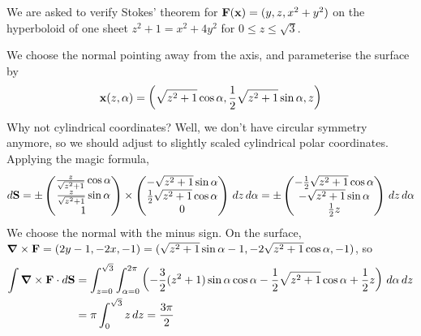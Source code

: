 \documentclass{../template/note}
\begin{document}
    \begin{example*}[hard]
        We are asked to verify Stokes' theorem for \(\V F(\V x) = (y, z, x^2+y^2)\) on the hyperboloid of one sheet \(z^2 + 1 = x^2 + 4y^2\) for \(0 \leq z \leq \sqrt 3\).

        We choose the normal pointing away from the axis, and parameterise the surface by
        \begin{align*}
            \V x(z, \alpha) = \left(\sqrt{z^2+1} \cos \alpha, \frac 1 2\sqrt{z^2+1}\sin \alpha, z\right)
        \end{align*}
        Why not cylindrical coordinates? Well, we don't have circular symmetry anymore, so we should adjust to slightly scaled cylindrical polar coordinates. Applying the magic formula,
        \begin{align*}
            d \V S = \pm \begin{pmatrix}
             \frac z{\sqrt{z^2+1}} \cos \alpha \\
             \frac z{\sqrt{z^2+1}} \sin \alpha \\
             1 \\
            \end{pmatrix} \times \begin{pmatrix}
             -\sqrt{z^2+1} \sin \alpha \\
             \frac 1 2 \sqrt{z^2+1} \cos \alpha \\
             0 \\
            \end{pmatrix} \D z \D \alpha = \pm \begin{pmatrix}
             -\frac 1 2 \sqrt{z^2+1} \cos \alpha \\
             -\sqrt{z^2+1} \sin \alpha \\
             \frac 1 2 z \\
            \end{pmatrix} \D z \D \alpha
        \end{align*}
        We choose the normal with the minus sign. On the surface, \(\curl \V F = (2y-1, -2x, -1) = (\sqrt{z^2+1} \sin \alpha - 1, -2\sqrt{z^2+1}\cos \alpha, -1)\), so 
        \begin{align*}
            \int \curl \V F \cdot d \V S &= \int_{z=0}^{\sqrt 3} \int_{\alpha = 0}^{2\pi} \left(-\frac 3 2 (z^2+1) \sin \alpha \cos \alpha - \frac 1 2 \sqrt{z^2+1} \cos \alpha + \frac 1 2 z\right) \D \alpha \D z \\
            &= \pi \int_0^{\sqrt 3} z \D z = \frac{3\pi}{2}

\end{align*}
\end{example*}
\end{document}
